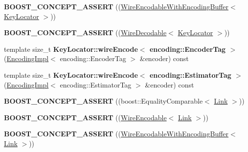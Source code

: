 \begin{DoxyCompactItemize}
\item 
{\bfseries B\+O\+O\+S\+T\+\_\+\+C\+O\+N\+C\+E\+P\+T\+\_\+\+A\+S\+S\+E\+RT} ((\hyperlink{classndn_1_1WireEncodableWithEncodingBuffer}{Wire\+Encodable\+With\+Encoding\+Buffer}$<$ \hyperlink{classndn_1_1KeyLocator}{Key\+Locator} $>$))\hypertarget{namespacendn_a7330d143b85dc89d6f14c8cf83343c4d}{}\label{namespacendn_a7330d143b85dc89d6f14c8cf83343c4d}

\item 
{\bfseries B\+O\+O\+S\+T\+\_\+\+C\+O\+N\+C\+E\+P\+T\+\_\+\+A\+S\+S\+E\+RT} ((\hyperlink{classndn_1_1WireDecodable}{Wire\+Decodable}$<$ \hyperlink{classndn_1_1KeyLocator}{Key\+Locator} $>$))\hypertarget{namespacendn_a4e4d925289ab4d70cedf4cc8e99715ef}{}\label{namespacendn_a4e4d925289ab4d70cedf4cc8e99715ef}

\item 
template size\+\_\+t {\bfseries Key\+Locator\+::wire\+Encode$<$ encoding\+::\+Encoder\+Tag $>$} (\hyperlink{classndn_1_1encoding_1_1EncodingImpl}{Encoding\+Impl}$<$ encoding\+::\+Encoder\+Tag $>$ \&encoder) const\hypertarget{namespacendn_a10471cd8b9a594ebc712ca512c18cdde}{}\label{namespacendn_a10471cd8b9a594ebc712ca512c18cdde}

\item 
template size\+\_\+t {\bfseries Key\+Locator\+::wire\+Encode$<$ encoding\+::\+Estimator\+Tag $>$} (\hyperlink{classndn_1_1encoding_1_1EncodingImpl}{Encoding\+Impl}$<$ encoding\+::\+Estimator\+Tag $>$ \&encoder) const\hypertarget{namespacendn_a838c7b965fe0127c85ba89d281176d3d}{}\label{namespacendn_a838c7b965fe0127c85ba89d281176d3d}

\item 
{\bfseries B\+O\+O\+S\+T\+\_\+\+C\+O\+N\+C\+E\+P\+T\+\_\+\+A\+S\+S\+E\+RT} ((boost\+::\+Equality\+Comparable$<$ \hyperlink{classndn_1_1Link}{Link} $>$))\hypertarget{namespacendn_ad30d3442a4a9987a8dbbac1fc16191e6}{}\label{namespacendn_ad30d3442a4a9987a8dbbac1fc16191e6}

\item 
{\bfseries B\+O\+O\+S\+T\+\_\+\+C\+O\+N\+C\+E\+P\+T\+\_\+\+A\+S\+S\+E\+RT} ((\hyperlink{classndn_1_1WireEncodable}{Wire\+Encodable}$<$ \hyperlink{classndn_1_1Link}{Link} $>$))\hypertarget{namespacendn_a3461c8bc4e0bfd02e59c0476d08f1d51}{}\label{namespacendn_a3461c8bc4e0bfd02e59c0476d08f1d51}

\item 
{\bfseries B\+O\+O\+S\+T\+\_\+\+C\+O\+N\+C\+E\+P\+T\+\_\+\+A\+S\+S\+E\+RT} ((\hyperlink{classndn_1_1WireEncodableWithEncodingBuffer}{Wire\+Encodable\+With\+Encoding\+Buffer}$<$ \hyperlink{classndn_1_1Link}{Link} $>$))\hypertarget{namespacendn_aa64af27c4c5b001625e8eb1311beecdb}{}\label{namespacendn_aa64af27c4c5b001625e8eb1311beecdb}


\end{DoxyCompactItemize}
